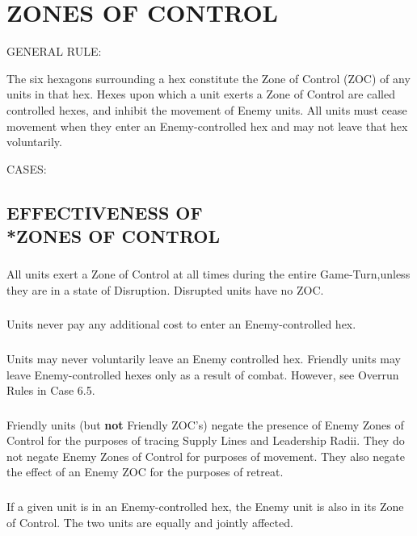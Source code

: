 \section{ZONES OF CONTROL}

GENERAL RULE:

The six hexagons surrounding a hex constitute the Zone of Control (ZOC) of any units in that hex. Hexes upon which a unit exerts a Zone of Control are called controlled hexes, and inhibit the movement of Enemy units. All units must cease movement when they enter an Enemy-controlled hex and may not leave that hex voluntarily.

CASES:

\subsection{EFFECTIVENESS OF\\*ZONES OF CONTROL}

\subsubsection{} All units exert a Zone of Control at all times during the entire Game-Turn,unless they are in a state of Disruption. Disrupted units have no ZOC.

\subsubsection{} Units never pay any additional cost to enter an Enemy-controlled hex.

\subsubsection{} Units may never voluntarily leave an Enemy controlled hex. Friendly units may leave Enemy-controlled hexes only as a result of combat. However, see Overrun Rules in Case 6.5.

\subsubsection{} Friendly units (but \textbf{not} Friendly ZOC's) negate the presence of Enemy Zones of Control for the purposes of tracing Supply Lines and Leadership Radii. They do not negate Enemy Zones of Control for purposes of movement. They also negate the effect of an Enemy ZOC for the purposes of retreat.

\subsubsection{} If a given unit is in an Enemy-controlled hex, the Enemy unit is also in its Zone of Control. The two units are equally and jointly affected.

